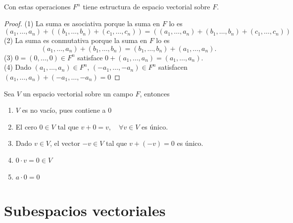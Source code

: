 \documentclass[12pt,a4paper]{book}
\begin{document}
    \begin{proposicion}
    \label{prop:12}
        Con estas operaciones $F^{n}$ tiene estructura de espacio vectorial sobre $F$.
    \end{proposicion}

    \begin{proof}
        (1) La suma es asociativa porque la suma en $F$ lo es
        \begin{equation*}
            (a_{1},\dots,a_{n})+((b_{1},\dots,b_{n})+(c_{1},\dots,c_{n}))=((a_{1},\dots,a_{n})+(b_{1},\dots,b_{n})+(c_{1},\dots,c_{n}))
        \end{equation*}
        (2) La suma es conmutativa porque la suma en $F$ lo es
        \begin{equation*}
            (a_{1},\dots,a_{n})+(b_{1},\dots,b_{n})=(b_{1},\dots,b_{n})+(a_{1},\dots,a_{n}).
        \end{equation*}
        (3) $0=(0,\dots,0)\in F^{n}$ satisface $0+(a_{1},\dots,a_{n})=(a_{1},\dots,a_{n})$.\\
        (4) Dado $(a_{1},\dots,a_{n})\in F^{n}$, $(-a_{1},\dots,-a_{n})\in F^{n}$ satisfacen
        $(a_{1},\dots,a_{n})+(-a_{1},\dots,-a_{n})=0$
    \end{proof}

    \begin{proposicion}
    \label{prop:13}
        Sea $V$ un espacio vectorial sobre un campo $F$, entonces
        \begin{enumerate}
            \item[(1)] $V$ es no vacío, pues contiene a 0
            \item[(2)] El cero $0\in V$ tal que $v+0=v,\quad\forall v\in V$ es único.
            \item[(3)] Dado $v\in V$, el vector $-v\in V$ tal que $v+(-v)=0$ es único.
            \item[(4)] $0\cdot v=0\in V$
            \item[(5)] $a\cdot 0=0$ 
        \end{enumerate}
    \end{proposicion}

    \section{Subespacios vectoriales}
\end{document}
